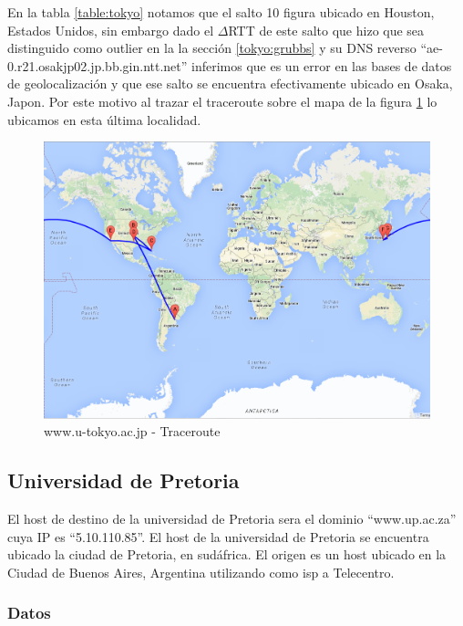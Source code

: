 En la tabla \ref{table:tokyo} notamos que el salto 10 figura ubicado en Houston, Estados Unidos, sin embargo dado el $\Delta$RTT de este salto que hizo que sea distinguido como outlier en la la sección \ref{tokyo:grubbs} y su DNS reverso ``ae-0.r21.osakjp02.jp.bb.gin.ntt.net'' inferimos que es un error en las bases de datos de geolocalización y que ese salto se encuentra efectivamente ubicado en Osaka, Japon. Por este motivo al trazar el traceroute sobre el mapa de la figura \ref{mapa:tokyo} lo ubicamos en esta última localidad.

\begin{figure}[H]
    \begin{center}
        \includegraphics[width=1\textwidth]{data/mapa-tokyo.png}
        \caption{www.u-tokyo.ac.jp - Traceroute}
        \label{mapa:tokyo}
    \end{center}
\end{figure}

\subsection{Universidad de Pretoria}
El host de destino de la universidad de Pretoria sera el dominio ``www.up.ac.za'' cuya IP es ``5.10.110.85''. El host de la universidad de Pretoria se encuentra ubicado la ciudad de Pretoria, en sudáfrica. El origen es un host ubicado en la Ciudad de Buenos Aires, Argentina utilizando como isp a Telecentro.

\subsubsection{Datos}

